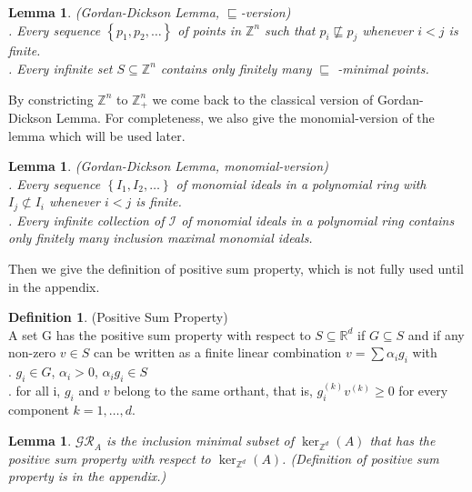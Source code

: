 \documentclass{article}
\theoremstyle{plain}
\newtheorem{lemma}[theorem]{Lemma}
\theoremstyle{definition}
\newtheorem{definition}[theorem]{Definition}
\begin{document}
\begin{lemma}(Gordan-Dickson Lemma, $\sqsubseteq$-version)\\
. Every sequence  $\left\{p_{1}, p_{2}, \ldots\right\}$  of points in $ \mathbb{Z}^{n}$  such that  $p_{i} \not\sqsubseteq p_{j}$  whenever  $i<j $ is finite. \\
. Every infinite set  $S \subseteq \mathbb{Z}^{n} $ contains only finitely many  $\sqsubseteq$ -minimal points.
\end{lemma}

By constricting $ \mathbb{Z}^{n}$ to $ \mathbb{Z}_{+}^{n}$ we come back to the classical version of Gordan-Dickson Lemma. For completeness, we also give the monomial-version of the lemma which will be used later.

\begin{lemma}(Gordan-Dickson Lemma, monomial-version)\\
.  Every sequence  $\left\{I_{1}, I_{2}, \ldots\right\}$  of monomial ideals in a polynomial ring with  $I_{j} \not\subset I_{i}$  whenever $ i<j$  is finite.\\
.  Every infinite collection of   $\mathcal{I}$   of monomial ideals in a polynomial ring contains only finitely many inclusion maximal monomial ideals. 
\end{lemma}

Then we give the definition of positive sum property, which is not fully used until in the appendix.

\begin{definition}(Positive Sum Property) \\
A set  G  has the positive sum property with respect to  $S \subseteq \mathbb{R}^{d}$  if $ G \subseteq S$  and if any non-zero  $v \in S$  can be written as a finite linear combination  $v=\sum \alpha_{i} g_{i}$  with\\
.  $g_{i} \in G$, $\alpha_{i}>0$, $\alpha_{i} g_{i} \in S$\\
.  for all  i, $g_{i}$  and  $v$  belong to the same orthant, that  is, $g_{i}^{(k)} v^{(k)} \geq 0$  for every component  $k=1, \ldots, d $. 
\end{definition}

\begin{lemma} $\mathcal{GR}_{A} $ is the inclusion minimal subset of  $\operatorname{ker}_{\mathbb{Z}^{d}}(A)$  that has the positive sum property with respect to  $\operatorname{ker}_{\mathbb{Z}^{d}}(A)$.  (Definition of positive sum property is in the appendix.) 
\end{lemma}
\end{document}

